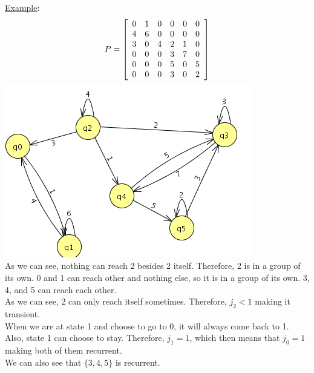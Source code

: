   \noindent\underline{Example}:
    $$
      P = \left[
        \begin{array}{c c c c c c}
          0 & 1 & 0 & 0 & 0 & 0\\
          4 & 6 & 0 & 0 & 0 & 0\\
          3 & 0 & 4 & 2 & 1 & 0\\
          0 & 0 & 0 & 3 & 7 & 0\\
          0 & 0 & 0 & 5 & 0 & 5\\
          0 & 0 & 0 & 3 & 0 & 2\\
        \end{array}
      \right]
    $$
    \includegraphics{Ex2_4_27.png}\\
    As we can see, nothing can reach 2 besides 2 itself. Therefore, 2 is
    in a group of its own. 0 and 1 can reach other and nothing else, so it
    is in a group of its own. 3, 4, and 5 can reach each other.\\
    As we can see, 2 can only reach itself sometimes. Therefore, $j_2 < 1$ 
    making it transient.\\
    When we are at state 1 and choose to go to 0, it will always come back to 1.
    Also, state 1 can choose to stay. Therefore, $j_1 = 1$, which then
    means that $j_0 = 1$ making both of them recurrent.\\
    We can also see that $\{3, 4, 5\}$ is recurrent.\\

